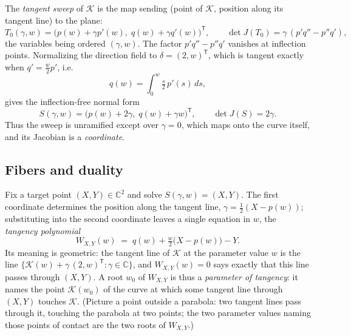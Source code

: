 \documentclass[11pt]{article}
\numberwithin{equation}{section}
\theoremstyle{plain}
\theoremstyle{definition}
\theoremstyle{remark}
\newcommand{\C}{\mathbb{C}}
\begin{document}
The \emph{tangent sweep} of $\mathcal{K}$ is the map
sending (point of $\mathcal K$, position along its tangent line) to the plane:
\[
T_0(\gamma,w)=\bigl(p(w)+\gamma p'(w),\;q(w)+\gamma q'(w)\bigr)^{\mathsf T},
\qquad
\det J(T_0)=\gamma\,(p'q''-p''q') ,
\]
the variables being ordered $(\gamma,w)$.
The factor $p'q''-p''q'$ vanishes at inflection points. Normalizing the direction
field to $\delta=(2,w)^{\mathsf T}$, which is tangent exactly when $q'=\tfrac{w}{2}p'$, i.e.
\begin{equation}\label{eq:normalization}
q(w)=\int_0^w \tfrac{s}{2}\,p'(s)\,ds ,
\end{equation}
gives the inflection-free normal form
\[
S(\gamma,w)=\bigl(p(w)+2\gamma,\;q(w)+\gamma w\bigr)^{\mathsf T},\qquad \det J(S)=2\gamma .
\]
Thus the sweep is unramified except over $\gamma=0$, which maps onto the curve
itself, and its Jacobian is a \emph{coordinate}.

\subsection{Fibers and duality}\label{subsec:fibdual}

Fix a target point $(X,Y)\in\C^2$ and solve $S(\gamma,w)=(X,Y)$. The first
coordinate determines the position along the tangent line,
$\gamma=\tfrac12(X-p(w))$; substituting into the second coordinate leaves a
single equation in $w$, the \emph{tangency polynomial}
\begin{equation}\label{eq:tangency}
W_{X,Y}(w)\;=\;q(w)+\tfrac{w}{2}\bigl(X-p(w)\bigr)-Y .
\end{equation}
Its meaning is geometric: the tangent line of $\mathcal K$ at the parameter
value $w$ is the line $\{\mathcal K(w)+\gamma\,(2,w)^{\mathsf T}:\gamma\in\C\}$, and
$W_{X,Y}(w)=0$ says exactly that this line passes through $(X,Y)$. A root
$w_0$ of $W_{X,Y}$ is thus a \emph{parameter of tangency}: it names the point
$\mathcal K(w_0)$ of the curve at which some tangent line through $(X,Y)$
touches $\mathcal K$. (Picture a point outside a parabola: two tangent lines
pass through it, touching the parabola at two points; the two parameter values
naming those points of contact are the two roots of $W_{X,Y}$.)
\end{document}
